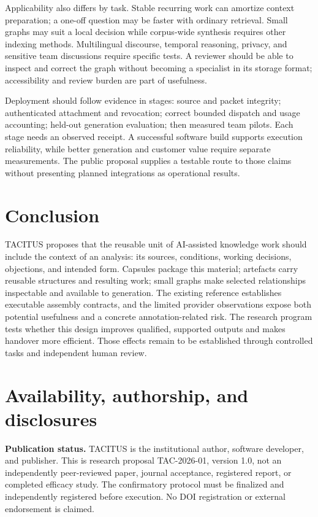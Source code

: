 \documentclass[
  11pt,
]{article}
\let\originalsection\section
\renewcommand{\section}{\Needspace{5\baselineskip}\originalsection}
\begin{document}
Applicability also differs by task. Stable recurring work can amortize
context preparation; a one-off question may be faster with ordinary
retrieval. Small graphs may suit a local decision while corpus-wide
synthesis requires other indexing methods. Multilingual discourse,
temporal reasoning, privacy, and sensitive team discussions require
specific tests. A reviewer should be able to inspect and correct the
graph without becoming a specialist in its storage format; accessibility
and review burden are part of usefulness.

Deployment should follow evidence in stages: source and packet
integrity; authenticated attachment and revocation; correct bounded
dispatch and usage accounting; held-out generation evaluation; then
measured team pilots. Each stage needs an observed receipt. A successful
software build supports execution reliability, while better generation
and customer value require separate measurements. The public proposal
supplies a testable route to those claims without presenting planned
integrations as operational results.

\section{Conclusion}\label{conclusion}

TACITUS proposes that the reusable unit of AI-assisted knowledge work
should include the context of an analysis: its sources, conditions,
working decisions, objections, and intended form. Capsules package this
material; artefacts carry reusable structures and resulting work; small
graphs make selected relationships inspectable and available to
generation. The existing reference establishes executable assembly
contracts, and the limited provider observations expose both potential
usefulness and a concrete annotation-related risk. The research program
tests whether this design improves qualified, supported outputs and
makes handover more efficient. Those effects remain to be established
through controlled tasks and independent human review.

\section{Availability, authorship, and
disclosures}\label{availability-authorship-and-disclosures}

\textbf{Publication status.} TACITUS is the institutional author,
software developer, and publisher. This is research proposal
TAC-2026-01, version 1.0, not an independently peer-reviewed paper,
journal acceptance, registered report, or completed efficacy study. The
confirmatory protocol must be finalized and independently registered
before execution. No DOI registration or external endorsement is
claimed.
\end{document}
